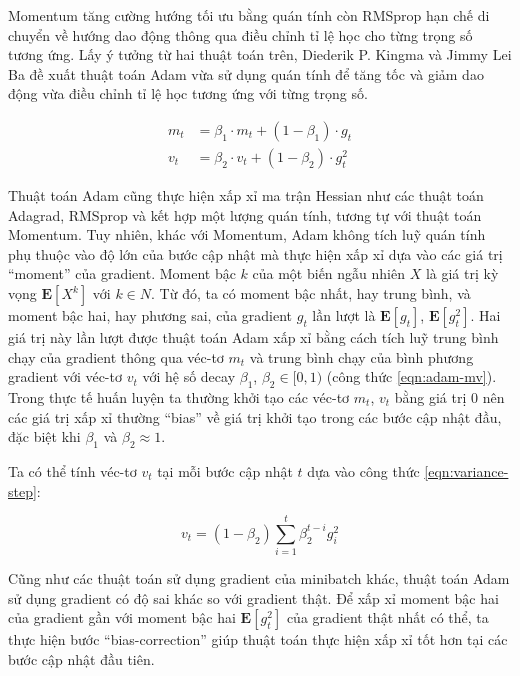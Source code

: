 Momentum tăng cường hướng tối ưu bằng quán tính còn RMSprop hạn chế di chuyển về hướng dao động thông qua điều chỉnh tỉ lệ học cho từng trọng số tương ứng. Lấy ý tưởng từ hai thuật toán trên, Diederik P. Kingma và Jimmy Lei Ba đề xuất thuật toán Adam vừa sử dụng quán tính để tăng tốc và giảm dao động vừa điều chỉnh tỉ lệ học tương ứng với từng trọng số\cite{kingma2014adam}.

\begin{equation} \label{eqn:adam-mv}
	\begin{aligned}
		m_t &= \beta_1 \cdot m_t + (1 - \beta_1) \cdot g_t \\
	v_t &= \beta_2 \cdot v_t + (1 - \beta_2) \cdot g_t^2
	\end{aligned}
\end{equation}

Thuật toán Adam cũng thực hiện xấp xỉ ma trận Hessian như các thuật toán Adagrad, RMSprop và kết hợp một lượng quán tính, tương tự với thuật toán Momentum. Tuy nhiên, khác với Momentum, Adam không tích luỹ quán tính phụ thuộc vào độ lớn của bước cập nhật mà thực hiện xấp xỉ dựa vào các giá trị ``moment'' của gradient. Moment bậc $k$ của một biến ngẫu nhiên $X$ là giá trị kỳ vọng $\mathbf{E}[X^k]$ với $k \in N$. Từ đó, ta có moment bậc nhất, hay trung bình, và moment bậc hai, hay phương sai, của gradient $g_t$ lần lượt là $\mathbf{E}[g_t]$, $\mathbf{E}[g_t^2]$. Hai giá trị này lần lượt được thuật toán Adam xấp xỉ bằng cách tích luỹ trung bình chạy của gradient thông qua véc-tơ $m_t$ và trung bình chạy của bình phương gradient với véc-tơ $v_t$ với hệ số decay $\beta_1$, $\beta_2 \in [0,1)$ (công thức \ref{eqn:adam-mv}). Trong thực tế huấn luyện ta thường khởi tạo các véc-tơ $m_t$, $v_t$ bằng giá trị 0 nên các giá trị xấp xỉ thường ``bias'' về giá trị khởi tạo trong các bước cập nhật đầu, đặc biệt khi $\beta_1$ và $\beta_2 \approx 1$.

Ta có thể tính véc-tơ $v_t$ tại mỗi bước cập nhật $t$ dựa vào công thức \ref{eqn:variance-step}:

\begin{equation}
	\label{eqn:variance-step}
	v_t = (1-\beta_2) \sum_{i=1}^t \beta_2^{t-i} g_i^2
\end{equation}

Cũng như các thuật toán sử dụng gradient của minibatch khác, thuật toán Adam sử dụng gradient có độ sai khác so với gradient thật. Để xấp xỉ moment bậc hai của gradient gần với moment bậc hai $\mathbf{E}[g_t^2]$ của gradient thật nhất có thể, ta thực hiện bước ``bias-correction'' giúp thuật toán thực hiện xấp xỉ tốt hơn tại các bước cập nhật đầu tiên.

